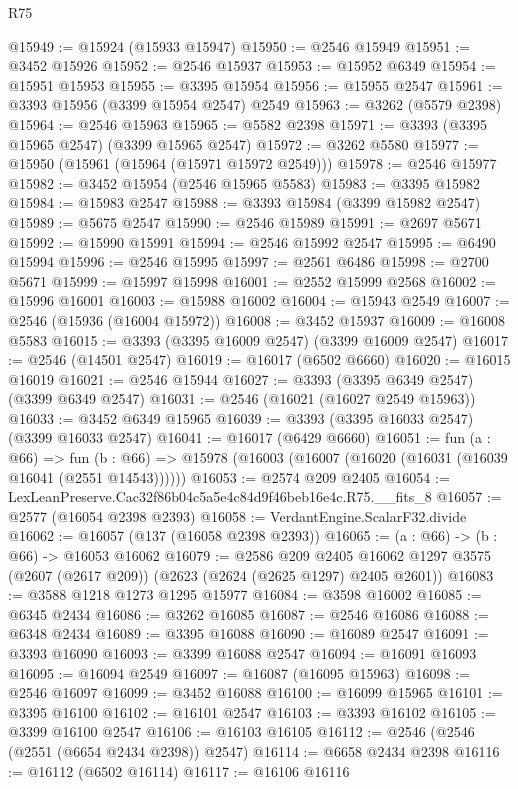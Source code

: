 \begin{lexlean}{R75}
\begin{coremodule}
@15949 := @15924 (@15933 @15947)
@15950 := @2546 @15949
@15951 := @3452 @15926
@15952 := @2546 @15937
@15953 := @15952 @6349
@15954 := @15951 @15953
@15955 := @3395 @15954
@15956 := @15955 @2547
@15961 := @3393 @15956 (@3399 @15954 @2547) @2549
@15963 := @3262 (@5579 @2398)
@15964 := @2546 @15963
@15965 := @5582 @2398
@15971 := @3393 (@3395 @15965 @2547) (@3399 @15965 @2547)
@15972 := @3262 @5580
@15977 := @15950 (@15961 (@15964 (@15971 @15972 @2549)))
@15978 := @2546 @15977
@15982 := @3452 @15954 (@2546 @15965 @5583)
@15983 := @3395 @15982
@15984 := @15983 @2547
@15988 := @3393 @15984 (@3399 @15982 @2547)
@15989 := @5675 @2547
@15990 := @2546 @15989
@15991 := @2697 @5671
@15992 := @15990 @15991
@15994 := @2546 @15992 @2547
@15995 := @6490 @15994
@15996 := @2546 @15995
@15997 := @2561 @6486
@15998 := @2700 @5671
@15999 := @15997 @15998
@16001 := @2552 @15999 @2568
@16002 := @15996 @16001
@16003 := @15988 @16002
@16004 := @15943 @2549
@16007 := @2546 (@15936 (@16004 @15972))
@16008 := @3452 @15937
@16009 := @16008 @5583
@16015 := @3393 (@3395 @16009 @2547) (@3399 @16009 @2547)
@16017 := @2546 (@14501 @2547)
@16019 := @16017 (@6502 @6660)
@16020 := @16015 @16019
@16021 := @2546 @15944
@16027 := @3393 (@3395 @6349 @2547) (@3399 @6349 @2547)
@16031 := @2546 (@16021 (@16027 @2549 @15963))
@16033 := @3452 @6349 @15965
@16039 := @3393 (@3395 @16033 @2547) (@3399 @16033 @2547)
@16041 := @16017 (@6429 @6660)
@16051 := fun (a : @66) =>
  fun (b : @66) => @15978 (@16003 (@16007 (@16020 (@16031 (@16039 @16041 (@2551 @14543))))))
@16053 := @2574 @209 @2405
@16054 := LexLeanPreserve.Cac32f86b04c5a5e4c84d9f46beb16e4c.R75.__fits_8
@16057 := @2577 (@16054 @2398 @2393)
@16058 := VerdantEngine.ScalarF32.divide
@16062 := @16057 (@137 (@16058 @2398 @2393))
@16065 := (a : @66) -> (b : @66) -> @16053 @16062
@16079 := @2586
    @209
    @2405
    @16062
    @1297
    @3575
    (@2607 (@2617 @209))
    (@2623 (@2624 (@2625 @1297) @2405 @2601))
@16083 := @3588 @1218 @1273 @1295 @15977
@16084 := @3598 @16002
@16085 := @6345 @2434
@16086 := @3262 @16085
@16087 := @2546 @16086
@16088 := @6348 @2434
@16089 := @3395 @16088
@16090 := @16089 @2547
@16091 := @3393 @16090
@16093 := @3399 @16088 @2547
@16094 := @16091 @16093
@16095 := @16094 @2549
@16097 := @16087 (@16095 @15963)
@16098 := @2546 @16097
@16099 := @3452 @16088
@16100 := @16099 @15965
@16101 := @3395 @16100
@16102 := @16101 @2547
@16103 := @3393 @16102
@16105 := @3399 @16100 @2547
@16106 := @16103 @16105
@16112 := @2546 (@2546 (@2551 (@6654 @2434 @2398)) @2547)
@16114 := @6658 @2434 @2398
@16116 := @16112 (@6502 @16114)
@16117 := @16106 @16116

\end{coremodule}
\end{lexlean}
